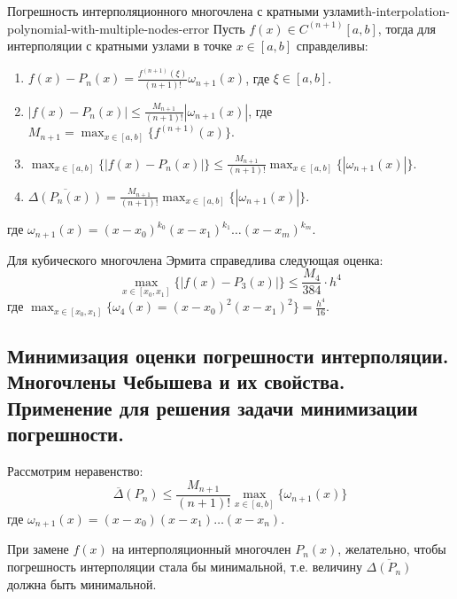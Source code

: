 \documentclass[14pt]{extarticle}
\begin{document}
    \begin{theorem}{Погрешность интерполяционного многочлена с кратными узлами}{th-interpolation-polynomial-with-multiple-nodes-error}
        Пусть $f(x) \in C^{(n + 1)}[a, b]$, тогда для интерполяции с кратными узлами в точке $x \in [a, b]$ справделивы:
        \begin{enumerate}
            \item $f(x) - P_{n}(x) = \frac{f^{(n + 1)}(\xi)}{(n + 1)!}\omega_{n+1}(x)$, где $\xi \in [a, b]$.\\
            \item $|f(x) - P_{n}(x)| \leq \frac{M_{n+1}}{(n+1)!}|\omega_{n+1}(x)|$, где $M_{n+1} = \max_{x \in [a, b]}\{f^{(n+1)}(x)\}$.\\
            \item $\max_{x \in [a, b]}\{|f(x) - P_{n}(x)|\} \leq \frac{M_{n+1}}{(n+1)!}\max_{x \in [a, b]}\{|\omega_{n+1}(x)|\}$.\\
            \item $\overline{\Delta(P_{n}(x))} = \frac{M_{n+1}}{(n+1)!}\max_{x \in [a, b]}\{|\omega_{n+1}(x)|\}$.\\
        \end{enumerate}
        где $\omega_{n+1}(x) = (x - x_{0})^{k_{0}}(x - x_{1})^{k_{1}} \ldots (x-x_{m})^{k_{m}}$.
    
        \vspace{\baselineskip}
    
        Для кубического многочлена Эрмита справедлива следующая оценка:
        $$\max_{x \in [x_{0}, x_{1}]}\{|f(x) - P_{3}(x)|\} \leq \frac{M_{4}}{384} \cdot h^{4}$$
        где $\max_{x \in [x_{0}, x_{1}]}\{\omega_{4}(x) = (x - x_{0})^{2}(x - x_{1})^{2}\} = \frac{h^{4}}{16}$.
    \end{theorem}

\clearpage
\subsection{Минимизация оценки погрешности интерполяции. Многочлены Чебышева и их свойства. Применение для решения задачи минимизации погрешности.}

    Рассмотрим неравенство:
    $$\overline{\Delta}(P_{n}) \leq \frac{M_{n + 1}}{(n + 1)!} \max_{x \in [a, b]}\{\omega_{n+1}(x)\}$$
    где $\omega_{n+1}(x) = (x - x_{0})(x - x_{1}) \ldots (x - x_{n})$.

    \vspace{\baselineskip}

    При замене $f(x)$ на интерполяционный многочлен $P_{n}(x)$, желательно, чтобы погрешность интерполяции стала бы минимальной, т.е. величину $\overline{\Delta(P_{n})}$ должна быть минимальной.
    
\end{document}
